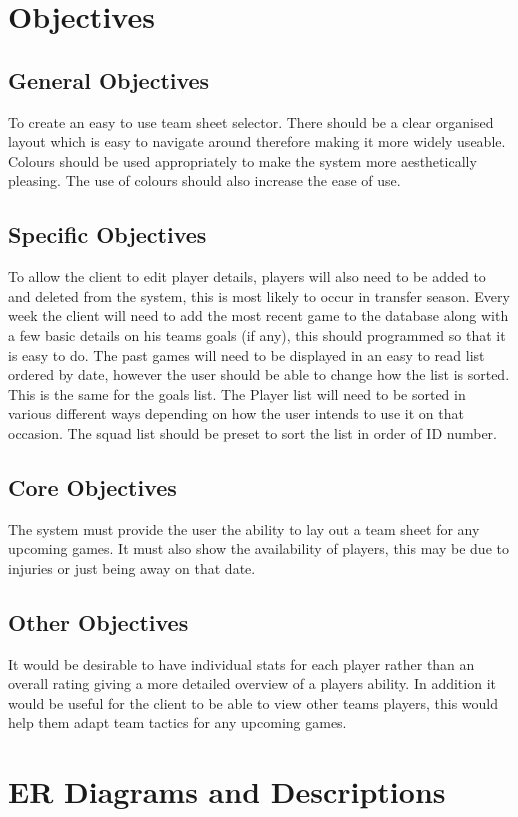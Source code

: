 \section{Objectives}


\subsection{General Objectives}
To create an easy to use team sheet selector. There should be a clear organised layout which is easy to navigate around therefore making it more widely useable. Colours should be used appropriately to make the system more aesthetically pleasing. The use of colours should also increase the ease of use. 
\subsection{Specific Objectives}
To allow the client to edit player details, players will also need to be added to and deleted from the system, this is most likely to occur in transfer season. Every week the client will need to add the most recent game to the database along with a few basic details on his teams goals (if any), this should programmed so that it is easy to do. The past games will need to be displayed in an easy to read list ordered by date, however the user should be able to change how the list is sorted. This is the same for the goals list. The Player list will need to be sorted in various different ways depending on how the user intends to use it on that occasion. The squad list should be preset to sort the list in order of ID number. 
\subsection{Core Objectives}
The system must provide the user the ability to lay out a team sheet for any upcoming games. It must also show the availability of players, this may be due to injuries or just being away on that date.     
\subsection{Other Objectives}
It would be desirable to have individual stats for each player rather than an overall rating giving a more detailed overview of a players ability. In addition it would be useful for the client to be able to view other teams players, this would help them adapt team tactics for any upcoming games.

\section{ER Diagrams and Descriptions}

